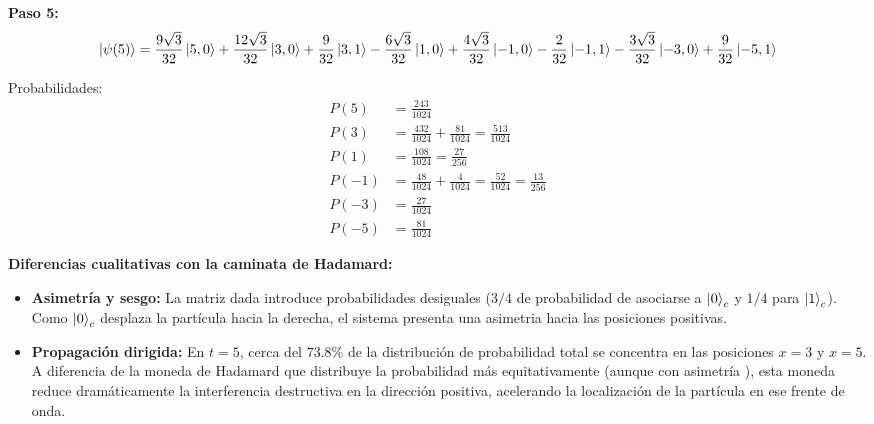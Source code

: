 \textbf{Paso 5:}
\begin{equation*}
\ket{\psi(5)} = \frac{9\sqrt{3}}{32}\ket{5,0} + \frac{12\sqrt{3}}{32}\ket{3,0} + \frac{9}{32}\ket{3,1} - \frac{6\sqrt{3}}{32}\ket{1,0} + \frac{4\sqrt{3}}{32}\ket{-1,0} - \frac{2}{32}\ket{-1,1} - \frac{3\sqrt{3}}{32}\ket{-3,0} + \frac{9}{32}\ket{-5,1}
\end{equation*}

Probabilidades:
\begin{align*}
P(5) &= \frac{243}{1024} \\
P(3) &= \frac{432}{1024} + \frac{81}{1024} = \frac{513}{1024} \\
P(1) &= \frac{108}{1024} = \frac{27}{256} \\
P(-1) &= \frac{48}{1024} + \frac{4}{1024} = \frac{52}{1024} = \frac{13}{256} \\
P(-3) &= \frac{27}{1024} \\
P(-5) &= \frac{81}{1024}
\end{align*}

\vspace{0.5cm}
\textbf{Diferencias cualitativas con la caminata de Hadamard:}
\begin{itemize}
    \item \textbf{Asimetría y sesgo:} La matriz dada introduce probabilidades desiguales ($3/4$ de
        probabilidad de asociarse a $\ket{0}_c$ y $1/4$ para $\ket{1}_c$). Como $\ket{0}_c$ desplaza
        la partícula hacia la derecha, el sistema presenta una asimetria hacia las posiciones positivas.
    \item \textbf{Propagación dirigida:} En $t=5$, cerca del $73.8\%$ de la distribución de probabilidad total se concentra en las posiciones $x=3$ y $x=5$. A diferencia de la moneda de Hadamard que distribuye la probabilidad más equitativamente (aunque con asimetría ), esta moneda reduce dramáticamente la interferencia destructiva en la dirección positiva, acelerando la localización de la partícula en ese frente de onda.
\end{itemize}

\vspace{.5cm}
